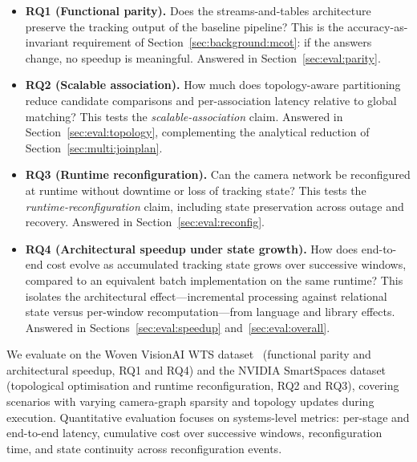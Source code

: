\documentclass[review]{elsarticle}
\begin{document}
\begin{itemize}[leftmargin=*]
    \item \textbf{RQ1 (Functional parity).} Does the streams-and-tables architecture preserve
    the tracking output of the baseline pipeline? This is the accuracy-as-invariant requirement
    of Section~\ref{sec:background:mcot}: if the answers change, no speedup is meaningful.
    Answered in Section~\ref{sec:eval:parity}.
    \item \textbf{RQ2 (Scalable association).} How much does topology-aware partitioning reduce
    candidate comparisons and per-association latency relative to global matching? This tests
    the \emph{scalable-association} claim. Answered in Section~\ref{sec:eval:topology},
    complementing the analytical reduction of Section~\ref{sec:multi:joinplan}.
    \item \textbf{RQ3 (Runtime reconfiguration).} Can the camera network be reconfigured at
    runtime without downtime or loss of tracking state? This tests the
    \emph{runtime-reconfiguration} claim, including state preservation across outage and
    recovery. Answered in Section~\ref{sec:eval:reconfig}.
    \item \textbf{RQ4 (Architectural speedup under state growth).} How does end-to-end cost
    evolve as accumulated tracking state grows over successive windows, compared to an
    equivalent batch implementation on the same runtime? This isolates the architectural
    effect---incremental processing against relational state versus per-window
    recomputation---from language and library effects. Answered in
    Sections~\ref{sec:eval:speedup} and~\ref{sec:eval:overall}.
\end{itemize}
 
We evaluate on the Woven VisionAI WTS dataset~\cite{kong2024wts} (functional parity and
architectural speedup, RQ1 and RQ4) and the NVIDIA SmartSpaces dataset~\cite{aicity2025track1}
(topological optimisation and runtime reconfiguration, RQ2 and RQ3), covering scenarios with
varying camera-graph sparsity and topology updates during execution. Quantitative evaluation
focuses on systems-level metrics: per-stage and end-to-end latency, cumulative cost over
successive windows, reconfiguration time, and state continuity across reconfiguration events.
\end{document}
